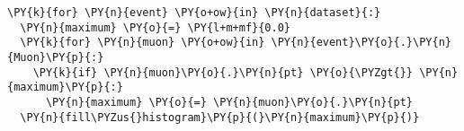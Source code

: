 \begin{Verbatim}[commandchars=\\\{\}]
\PY{k}{for} \PY{n}{event} \PY{o+ow}{in} \PY{n}{dataset}{:}
  \PY{n}{maximum} \PY{o}{=} \PY{l+m+mf}{0.0}
  \PY{k}{for} \PY{n}{muon} \PY{o+ow}{in} \PY{n}{event}\PY{o}{.}\PY{n}{Muon}\PY{p}{:}
    \PY{k}{if} \PY{n}{muon}\PY{o}{.}\PY{n}{pt} \PY{o}{\PYZgt{}} \PY{n}{maximum}\PY{p}{:}
      \PY{n}{maximum} \PY{o}{=} \PY{n}{muon}\PY{o}{.}\PY{n}{pt}
  \PY{n}{fill\PYZus{}histogram}\PY{p}{(}\PY{n}{maximum}\PY{p}{)}
\end{Verbatim}
